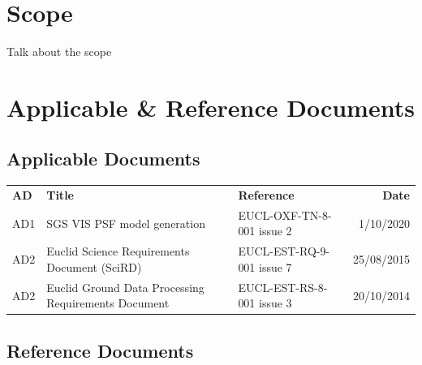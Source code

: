 \documentclass[11pt]{EuclidVIS}
\numberwithin{table}{section}
\numberwithin{figure}{section}
\begin{document}
\section*{Scope}
Talk about the scope

\newpage



\section*{Applicable \& Reference Documents}

\subsection{Applicable Documents}

\noindent
\begin{tabularx}{1.0\textwidth}{ | l | X | X | r |}
\hline
\rowcolor{gray!30}
\textbf{AD} & \textbf{Title} & \textbf{Reference} & \textbf{Date}\\
AD1 & SGS VIS PSF model generation & EUCL-OXF-TN-8-001 issue 2 & 1/10/2020 \\
\hline
AD2 & Euclid Science Requirements Document (SciRD) & EUCL-EST-RQ-9-001 issue 7 & 25/08/2015 \\
\hline
AD2 & Euclid Ground Data Processing Requirements Document & EUCL-EST-RS-8-001 issue 3 & 20/10/2014 \\
\hline
\end{tabularx}


\begingroup
\subsection{Reference Documents}
\let\clearpage\relax %
\vspace*{-3cm}
\renewcommand{\bibname}{}


\endgroup


\end{document}
